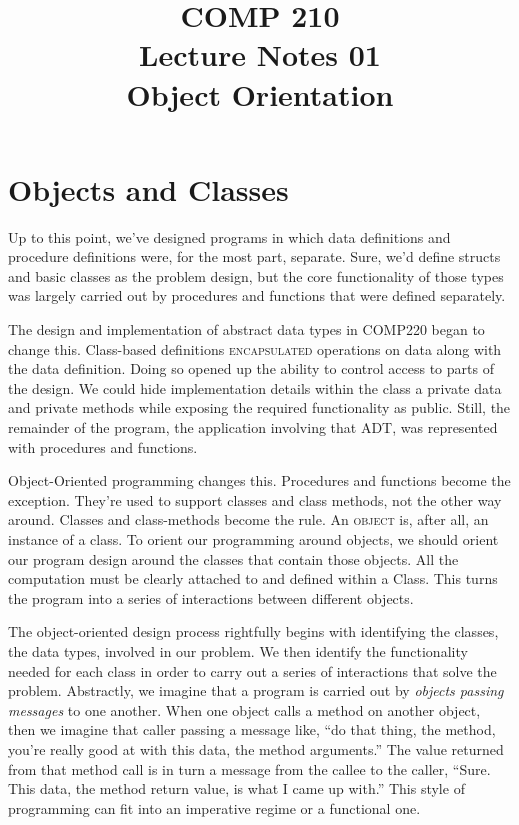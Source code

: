 \documentclass[nobib]{tufte-handout}
\title{COMP 210 \\ Lecture Notes 01 \\ Object Orientation}
\begin{document}
\maketitle

\begin{abstract}

\end{abstract}

\section{Objects and Classes}

Up to this point, we've designed programs in which data definitions and procedure definitions were, for the most part, separate. Sure, we'd define structs and basic classes as the problem design, but the core functionality of those types was largely carried out by procedures and functions that were defined separately.

The design and implementation of abstract data types in COMP220 began to change this. Class-based definitions \textsc{encapsulated} operations on data along with the data definition. Doing so opened up the ability to control access to parts of the design. We could hide implementation details within the class a private data and private methods while exposing the required functionality as public. Still, the remainder of the program, the application involving that ADT, was represented with procedures and functions.

Object-Oriented programming changes this.  Procedures and functions become the exception.  They're used to support classes and class methods, not the other way around. Classes and class-methods become the rule. An \textsc{object} is, after all, an instance of a class.  To orient our programming around objects, we should orient our program design around the classes that contain those objects.  All the computation must be clearly attached to and defined within a Class. This turns the program into a series of interactions between different objects.

The object-oriented design process rightfully begins with identifying the classes, the data types, involved in our problem.  We then identify the functionality needed for each class in order to carry out a series of interactions that solve the problem. Abstractly, we imagine that a program is carried out by \textit{objects passing messages} to one another. When one object calls a method on another object, then we imagine that caller passing a message like, ``do that thing, the method, you're really good at with this data, the method arguments.'' The value returned from that method call is in turn a message from the callee to the caller, ``Sure. This data, the method return value, is what I came up with.'' This style of programming can fit into an imperative regime or a functional one.
\end{document}

